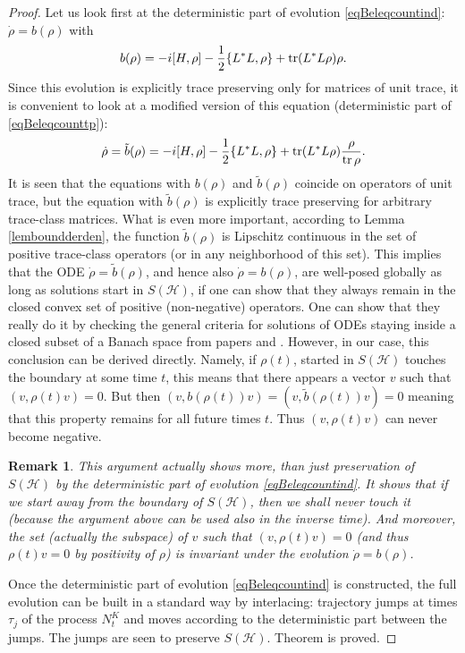 \documentclass[12pt]{article}
\def\HC{\mathcal{H}}
\def\tr{\rm{tr}}
\newtheorem{remark}{Remark}
\begin{document}
\begin{proof}
Let us look first at the deterministic part of evolution \eqref{eqBeleqcountind}:
$\dot \rho= b(\rho)$ with
\[
b(\rho)= -i[H, \rho] -\frac12 \{L^*L,\rho\}+ {\tr} (L^*L\rho) \rho.
\]
Since this evolution is explicitly trace preserving only for matrices of unit trace, it is convenient
to look at a modified version of this equation (deterministic part of \eqref{eqBeleqcounttp}):
\[
\dot \rho=\tilde b(\rho)=-i[H, \rho] -\frac12 \{L^*L,\rho\}+ {\tr} (L^*L\rho) \frac{\rho}{{\tr}\, \rho}.
\]
It is seen that the equations with $b(\rho)$ and $\tilde b(\rho)$ coincide
on operators of unit trace, but the equation with $\tilde b(\rho)$ is explicitly
trace preserving for arbitrary trace-class matrices. What is even more important,
according to Lemma \ref{lemboundderden}, the function $\tilde b(\rho)$ is Lipschitz
continuous in the set of positive trace-class operators (or in any neighborhood of
this set). This implies that the ODE $\dot \rho=\tilde b(\rho)$, and hence also
$\dot \rho=b(\rho)$, are well-posed globally as long as solutions start in $S(\HC)$,
if one can show that they always remain in the closed convex set of positive (non-negative) operators.
One can show that they really do it by checking
the general criteria for solutions of ODEs staying inside a closed subset of a Banach space from papers
 \cite{Martin} and \cite{Lakshm}. However, in our case, this conclusion can be derived directly. Namely, if
 $\rho(t)$, started in $S(\HC)$ touches the boundary at some time $t$, this means that there appears
  a vector $v$ such that $(v,\rho(t) v)=0$. But then $(v, b(\rho(t)) v)=(v,\tilde b(\rho(t))v)=0$ meaning
  that this property remains for all future times $t$. Thus $(v,\rho(t)v)$ can never become negative.

\begin{remark} This argument actually shows more, than just preservation of $S(\HC)$
by the deterministic part of evolution \eqref{eqBeleqcountind}. It shows that if
we start away from the boundary of $S(\HC)$, then we shall never touch it (because
the argument above can be used also in the inverse time). And moreover,
the set (actually the subspace) of $v$ such that $(v, \rho(t) v)=0$
(and thus $\rho(t)v=0$ by positivity of $\rho$)
is invariant under the evolution $\dot \rho=b(\rho)$.
\end{remark}

Once the deterministic part of  evolution \eqref{eqBeleqcountind} is constructed,
the full evolution can be built in a standard way by interlacing: trajectory jumps
at times $\tau_j$ of the process $N_t^K$ and moves according to the deterministic
part between the jumps. The jumps are seen to preserve $S(\HC)$. Theorem is proved.
\end{proof}
\end{document}
